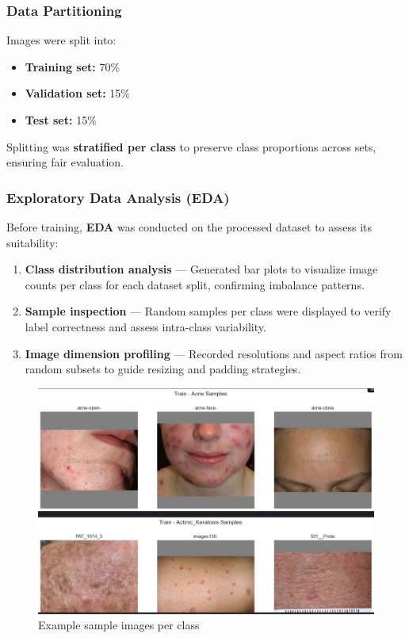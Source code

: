\documentclass[
  12pt,
  oneside]{article}
\providecommand{\tightlist}{%
  \setlength{\itemsep}{0pt}\setlength{\parskip}{0pt}}
\begin{document}
\subsubsection{Data Partitioning}\label{data-partitioning}

Images were split into:

\begin{itemize}
\tightlist
\item
  \textbf{Training set:} 70\%
\item
  \textbf{Validation set:} 15\%
\item
  \textbf{Test set:} 15\%
\end{itemize}

Splitting was \textbf{stratified per class} to preserve class
proportions across sets, ensuring fair evaluation.

\subsubsection{Exploratory Data Analysis
(EDA)}\label{exploratory-data-analysis-eda}

Before training, \textbf{EDA} was conducted on the processed dataset to
assess its suitability:

\begin{enumerate}
\def\labelenumi{\arabic{enumi}.}
\tightlist
\item
  \textbf{Class distribution analysis} --- Generated bar plots to
  visualize image counts per class for each dataset split, confirming
  imbalance patterns.
\item
  \textbf{Sample inspection} --- Random samples per class were displayed
  to verify label correctness and assess intra-class variability.
\item
  \textbf{Image dimension profiling} --- Recorded resolutions and aspect
  ratios from random subsets to guide resizing and padding strategies.
\end{enumerate}

\begin{figure}

{\centering \includegraphics[width=1\linewidth]{class_sample_images} 

}

\caption{Example sample images per class}\label{fig:unnamed-chunk-3}
\end{figure}
\end{document}
